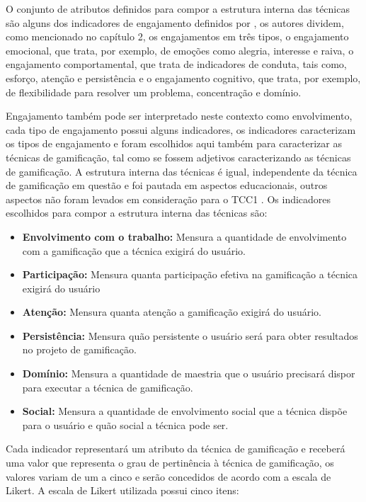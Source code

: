  O conjunto de atributos definidos para compor a estrutura interna das técnicas são alguns dos indicadores de engajamento definidos por \cite{fredericks2004school}, os autores dividem, como mencionado no capítulo 2, os engajamentos em três tipos, o engajamento emocional, que trata, por exemplo, de emoções como alegria, interesse e raiva, o engajamento comportamental, que trata de indicadores de conduta, tais como, esforço, atenção e persistência e o engajamento cognitivo, que trata, por exemplo, de flexibilidade para resolver um problema, concentração e domínio.

 Engajamento também pode ser interpretado neste contexto como envolvimento, cada tipo de engajamento possui alguns indicadores, os indicadores caracterizam os tipos de engajamento e foram escolhidos aqui também para caracterizar as técnicas de gamificação, tal como se fossem adjetivos caracterizando as técnicas de gamificação. A estrutura interna das técnicas é igual, independente da técnica de gamificação em questão e foi pautada em aspectos educacionais, outros aspectos não foram levados em consideração para o TCC1 . Os indicadores escolhidos para compor a estrutura interna das técnicas são: 


\begin{itemize}
\item  \textbf {Envolvimento com o trabalho:}  Mensura a quantidade de envolvimento com a gamificação que a técnica exigirá do usuário.
\item  \textbf {Participação:}  Mensura quanta participação efetiva na gamificação a técnica exigirá do usuário
\item  \textbf {Atenção:}  Mensura quanta atenção a gamificação exigirá do usuário.
\item  \textbf {Persistência:} Mensura quão persistente o usuário será para obter resultados no projeto de gamificação. 
\item  \textbf {Domínio:} Mensura a quantidade de maestria que o usuário precisará dispor para executar a técnica de gamificação. 
\item  \textbf{Social:} Mensura a quantidade de envolvimento social que a técnica dispõe para o usuário e quão social a técnica pode ser.
\end{itemize}


Cada indicador representará um atributo da técnica de gamificação e receberá uma valor que representa o grau de pertinência à técnica de gamificação, os valores variam de um a cinco e serão concedidos de acordo com a escala de Likert. A escala de Likert utilizada possui cinco itens: 

